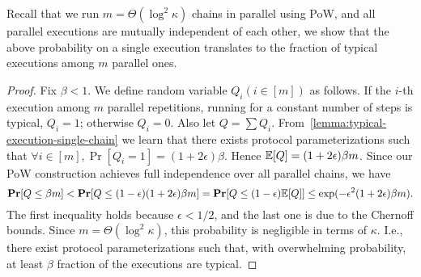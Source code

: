 Recall that we run $m = \Theta(\log^2 \kappa)$ chains in parallel using \mforone PoW, and all parallel executions are mutually independent of each other, we show that the above probability on a single execution translates to the fraction of typical executions among $m$ parallel ones.

\theoremtypicalexeuctionparallelchain*

\begin{proof}
    Fix $\beta < 1$.
    We define random variable $Q_i (i \in [m])$ as follows.
    If the $i$-th execution among $m$ parallel repetitions, running for a constant number of \phaseLength steps is typical, $Q_i = 1$; otherwise $Q_i = 0$.
    Also let $Q = \sum Q_i$.
    From~\cref{lemma:typical-execution-single-chain} we learn that there exists protocol parameterizations such that $\forall i \in [m], \Pr[Q_i = 1] = (1 + 2\epsilon)\beta$.
    Hence $\mathbb{E}[Q] = (1 + 2\epsilon)\beta m$.
    Since our \mforone PoW construction achieves full independence over all parallel chains, we have
    \[ \mathbf{Pr}[Q \le \beta m] < \mathbf{Pr}[Q \le (1 - \epsilon) (1 + 2\epsilon) \beta m] = \mathbf{Pr}[Q \le (1 - \epsilon) \mathbb{E}[Q]] \le \exp (- \epsilon^2 (1 + 2\epsilon) \beta m). \]
    The first inequality holds because $\epsilon < 1/2$, and the last one is due to the Chernoff bounds.
    Since $m = \Theta(\log^2 \kappa)$, this probability is negligible in terms of $\kappa$.
    I.e., there exist protocol parameterizations such that, with overwhelming probability, at least $\beta$ fraction of the executions are typical.
\end{proof}

